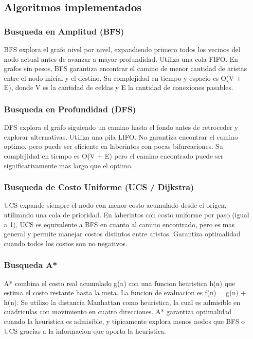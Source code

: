 \documentclass[12pt]{article}
\begin{document}
\subsection{Algoritmos implementados}

\subsubsection{Busqueda en Amplitud (BFS)}

BFS explora el grafo nivel por nivel, expandiendo primero todos los vecinos del nodo actual antes de avanzar a mayor profundidad. Utiliza una cola FIFO. En grafos sin pesos, BFS garantiza encontrar el camino de menor cantidad de aristas entre el nodo inicial y el destino. Su complejidad en tiempo y espacio es O(V + E), donde V es la cantidad de celdas y E la cantidad de conexiones pasables.

\subsubsection{Busqueda en Profundidad (DFS)}

DFS explora el grafo siguiendo un camino hasta el fondo antes de retroceder y explorar alternativas. Utiliza una pila LIFO. No garantiza encontrar el camino optimo, pero puede ser eficiente en laberintos con pocas bifurcaciones. Su complejidad en tiempo es O(V + E) pero el camino encontrado puede ser significativamente mas largo que el optimo.

\subsubsection{Busqueda de Costo Uniforme (UCS / Dijkstra)}

UCS expande siempre el nodo con menor costo acumulado desde el origen, utilizando una cola de prioridad. En laberintos con costo uniforme por paso (igual a 1), UCS es equivalente a BFS en cuanto al camino encontrado, pero es mas general y permite manejar costos distintos entre aristas. Garantiza optimalidad cuando todos los costos son no negativos.

\subsubsection{Busqueda A*}

A* combina el costo real acumulado g(n) con una funcion heuristica h(n) que estima el costo restante hasta la meta. La funcion de evaluacion es f(n) = g(n) + h(n). Se utilizo la distancia Manhattan como heuristica, la cual es admisible en cuadriculas con movimiento en cuatro direcciones. A* garantiza optimalidad cuando la heuristica es admisible, y tipicamente explora menos nodos que BFS o UCS gracias a la informacion que aporta la heuristica.
\end{document}
